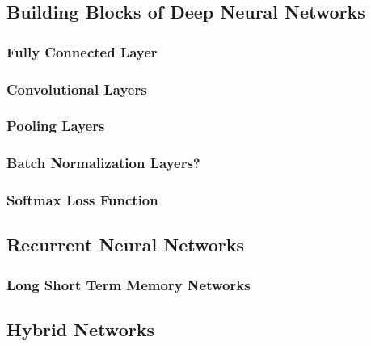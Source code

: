 \subsection{Building Blocks of Deep Neural Networks}


\subsubsection{Fully Connected Layer}
\subsubsection{Convolutional Layers}
\subsubsection{Pooling Layers}
\subsubsection{Batch Normalization Layers?}
\subsubsection{Softmax Loss Function}

\subsection{Recurrent Neural Networks}
\subsubsection{Long Short Term Memory Networks}

\subsection{Hybrid Networks}
\label{sec:hybrid_networks}

